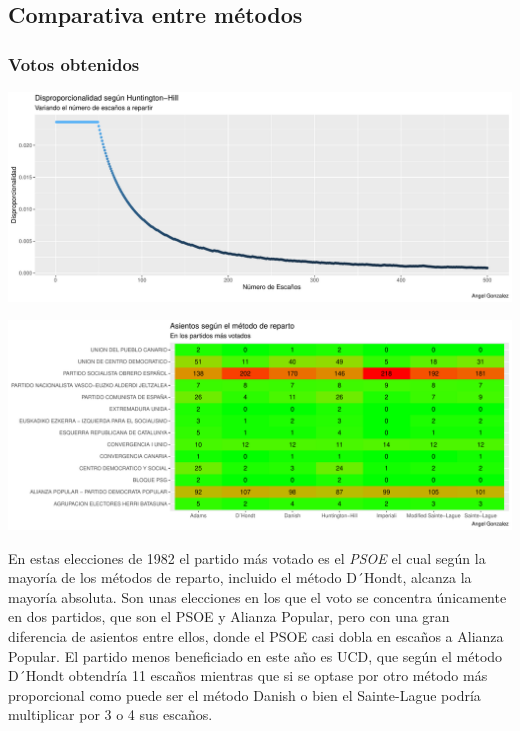 \documentclass[12pt,a4paper,]{book}
\numberwithin{dummy}{section}
\theoremstyle{ocrenumbox}
\theoremstyle{blacknumex}
\theoremstyle{blacknumbox}
\theoremstyle{ocrenum}
\theoremstyle{ocrenum}
\begin{document}
\hypertarget{comparativa-entre-muxe9todos-2}{%
\subsection{Comparativa entre
métodos}\label{comparativa-entre-muxe9todos-2}}

\hypertarget{votos-obtenidos-2}{%
\subsubsection{Votos obtenidos}\label{votos-obtenidos-2}}

\begin{center}\includegraphics[width=0.95\linewidth]{figurasR/unnamed-chunk-29-1} \end{center}

\begin{center}\includegraphics[width=0.95\linewidth]{figurasR/unnamed-chunk-29-2} \end{center}

En estas elecciones de 1982 el partido más votado es el \emph{PSOE} el
cual según la mayoría de los métodos de reparto, incluido el método
D´Hondt, alcanza la mayoría absoluta. Son unas elecciones en los que el
voto se concentra únicamente en dos partidos, que son el PSOE y Alianza
Popular, pero con una gran diferencia de asientos entre ellos, donde el
PSOE casi dobla en escaños a Alianza Popular. El partido menos
beneficiado en este año es UCD, que según el método D´Hondt obtendría 11
escaños mientras que si se optase por otro método más proporcional como
puede ser el método Danish o bien el Sainte-Lague podría multiplicar por
3 o 4 sus escaños.
\end{document}
